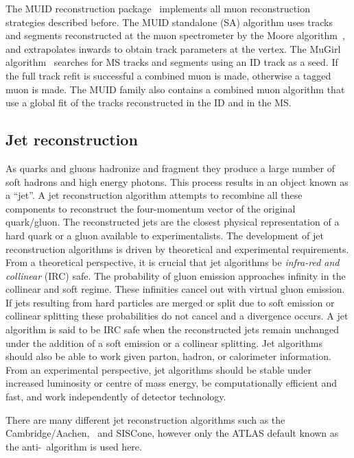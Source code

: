 The MUID reconstruction package~\cite{Detector:ExpectedPerf} implements all muon reconstruction strategies described before. The MUID standalone (SA) algorithm uses tracks and segments reconstructed at the muon spectrometer by the Moore algorithm~\cite{Detector:MooreReconstruction}, and extrapolates inwards to obtain track parameters at the vertex. The MuGirl algorithm~\cite{ObjSelection:MuGirl} searches for MS tracks and segments using an ID track as a seed. If the full track refit is successful a combined muon is made, otherwise a tagged muon is made. The MUID family also contains a combined muon algorithm that use a global fit of the tracks reconstructed in the ID and in the MS\@.

\subsection{Jet reconstruction}\label{sec:Detector-JetReconstruction}

As quarks and gluons hadronize and fragment they produce a large number of soft hadrons and high energy photons. This process results in an object known as a ``jet''. A jet reconstruction algorithm attempts to recombine all these components to reconstruct the four-momentum vector of the original quark/gluon. The reconstructed jets are the closest physical representation of a hard quark or a gluon available to experimentalists. The development of jet reconstruction algorithms is driven by theoretical and experimental requirements. From a theoretical perspective, it is crucial that jet algorithms be \emph{infra-red and collinear} (IRC) safe. The probability of gluon emission approaches infinity in the collinear and soft regime. These infinities cancel out with virtual gluon emission. If jets resulting from hard particles are merged or split due to soft emission or collinear splitting these probabilities do not cancel and a divergence occurs. A jet algorithm is said to be IRC safe when the reconstructed jets remain unchanged under the addition of a soft emission or a collinear splitting. Jet algorithms should also be able to work given parton, hadron, or calorimeter information. From an experimental perspective, jet algorithms should be stable under increased luminosity or centre of mass energy, be computationally efficient and fast, and work independently of detector technology. 

There are many different jet reconstruction algorithms such as the Cambridge/Aachen, \kt\ and SISCone, however only the ATLAS default known as the anti-\kt\ algorithm is used here.

